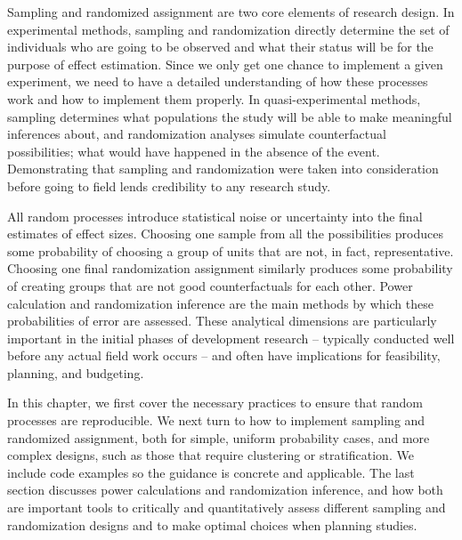 
\begin{fullwidth}
Sampling and randomized assignment are two core elements of research design.
In experimental methods, sampling and randomization directly determine
the set of individuals who are going to be observed
and what their status will be for the purpose of effect estimation.
Since we only get one chance to implement a given experiment,
we need to have a detailed understanding of how these processes work
and how to implement them properly.
In quasi-experimental methods, sampling determines what populations the study
will be able to make meaningful inferences about,
and randomization analyses simulate counterfactual possibilities;
what would have happened in the absence of the event.
Demonstrating that sampling and randomization were taken into consideration
before going to field lends credibility to any research study.

All random processes introduce statistical noise
or uncertainty into the final estimates of effect sizes.
Choosing one sample from all the possibilities produces some probability of
choosing a group of units that are not, in fact, representative.
Choosing one final randomization assignment similarly produces some probability of
creating groups that are not good counterfactuals for each other.
Power calculation and randomization inference
are the main methods by which these probabilities of error are assessed.
These analytical dimensions are particularly important in the initial phases of development research --
typically conducted well before any actual field work occurs --
and often have implications for feasibility, planning, and budgeting.

In this chapter, we first cover the necessary practices to ensure that random processes are reproducible.
We next turn to how to implement sampling and randomized assignment,
both for simple, uniform probability cases, and more complex designs,
such as those that require clustering or stratification.
We include code examples so the guidance is concrete and applicable.
The last section discusses power calculations and randomization inference,
and how both are important tools to critically and quantitatively assess different
sampling and randomization designs and to make optimal choices when planning studies.


\end{fullwidth}


